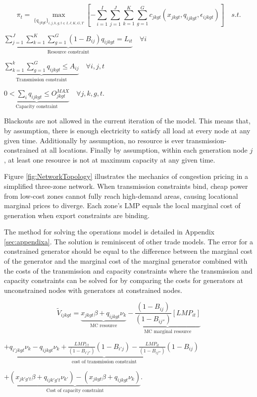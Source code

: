 \documentclass[12pt]{article}
\begin{document}
\begin{equation}
\pi_{t}=\max_{\{q_{ijkgt}\}_{i,j,k,g,t\in I,J,K,G,T}} [-\sum_{i=1}^I\sum_{j=1}^J \sum_{k=1}^K \sum_{g=1}^G c_{jkgt}(x_{jkgt},q_{ijkgt},\epsilon_{ijkgt})] \mspace{18mu} s.t.
 \end{equation}
   \begin{center}
     $\underbrace{\sum_{j=1}^J\sum_{k=1}^K \sum_{g=1}^G (1-B_{ij})q_{ijkgt}=L_{it}}_\text{Resource constraint} \mspace{18mu} \forall i$
 \end{center}
 \begin{center}
    $\underbrace{\sum_{k=1}^k \sum_{g=1}^G q_{ijkgt}\leq A_{ij}}_\text{Transmission constraint} \mspace{18mu} \forall i,j,t$
 \end{center}
   \begin{center}
     $\underbrace{0<\sum_{i} q_{ijkgt}\leq O_{jkgt}^{MAX}}_\text{Capacity constraint} \mspace{18mu} \forall j,k,g,t.$
 \end{center}

 Blackouts are not allowed in the current iteration of the model. This means that, by assumption, there is enough electricity to satisfy all load at every node at any given time. Additionally by assumption, no resource is ever transmission-constrained at all locations. Finally by assumption, within each generation node $j$, at least one resource is not at maximum capacity at any given time.

Figure \ref{fig:NetworkTopology} illustrates the mechanics of congestion pricing in a simplified three-zone network. When transmission constraints bind, cheap power from low-cost zones cannot fully reach high-demand areas, causing locational marginal prices to diverge. Each zone's LMP equals the local marginal cost of generation when export constraints are binding.

The method for solving the operations model is detailed in Appendix \ref{sec:appendixa}. The solution is reminiscent of other trade models. The error for a constrained generator should be equal to the difference between the marginal cost of the generator and the marginal cost of the marginal generator combined with the costs of the transmission and capacity constraints where the transmission and capacity constraints can be solved for by comparing the costs for generators at unconstrained nodes with generators at constrained nodes.

\begin{equation}\label{mlequation}
\tilde{V}_{ijkgt}=\underbrace{x_{jkgt}\beta+q_{ijkgt}\nu_k}_\text{MC resource}-\underbrace{\frac{(1-B_{ij})}{(1-B_{ij''})}[LMP_{it}]}_\text{MC marginal resource}
\end{equation}
\begin{center}
$+\underbrace{q_{i'jkgt}\nu_k-q_{ijkgt}\nu_k+\frac{LMP_{i't}}{(1-B_{i'j''})}(1-B_{i'j})-
\frac{LMP_{it}}{(1-B_{ij'''})}(1-B_{ij})}_\text{cost of transmission constraint}$

$+\underbrace{(x_{jk'g't}\beta+q_{ijk'g't}\nu_{k'})-(x_{jkgt}\beta+q_{ijkgt}\nu_k)}_\text{Cost of capacity constraint}$.
\end{center}
\end{document}
